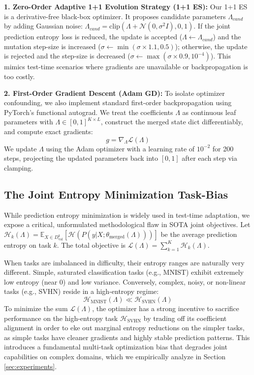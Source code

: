 \textbf{1. Zero-Order Adaptive 1+1 Evolution Strategy (1+1 ES):} Our 1+1 ES is a derivative-free black-box optimizer. It proposes candidate parameters $\Lambda_{cand}$ by adding Gaussian noise: $\Lambda_{cand} = \text{clip}(\Lambda + \mathcal{N}(0, \sigma^2 I), 0, 1)$. If the joint prediction entropy loss is reduced, the update is accepted ($\Lambda \leftarrow \Lambda_{cand}$) and the mutation step-size is increased ($\sigma \leftarrow \min(\sigma \times 1.1, 0.5)$); otherwise, the update is rejected and the step-size is decreased ($\sigma \leftarrow \max(\sigma \times 0.9, 10^{-4})$). This mimics test-time scenarios where gradients are unavailable or backpropagation is too costly.

\textbf{2. First-Order Gradient Descent (Adam GD):} To isolate optimizer confounding, we also implement standard first-order backpropagation using PyTorch's functional autograd. We treat the coefficients $\Lambda$ as continuous leaf parameters with $\Lambda \in [0, 1]^{K \times L}$, construct the merged state dict differentiably, and compute exact gradients:
\begin{equation}
    g = \nabla_{\Lambda} \mathcal{L}(\Lambda)
\end{equation}
We update $\Lambda$ using the Adam optimizer with a learning rate of $10^{-2}$ for 200 steps, projecting the updated parameters back into $[0, 1]$ after each step via clamping.

\subsection{The Joint Entropy Minimization Task-Bias}
While prediction entropy minimization is widely used in test-time adaptation, we expose a critical, unformulated methodological flaw in SOTA joint objectives. Let $\mathcal{H}_k(\Lambda) = \mathbb{E}_{X \in D^k_{\text{val}}} [\mathcal{H}(P(y | X; \theta_{\text{merged}}(\Lambda)))]$ be the average prediction entropy on task $k$. The total objective is $\mathcal{L}(\Lambda) = \sum_{k=1}^K \mathcal{H}_k(\Lambda)$. 

When tasks are imbalanced in difficulty, their entropy ranges are naturally very different. Simple, saturated classification tasks (e.g., MNIST) exhibit extremely low entropy (near 0) and low variance. Conversely, complex, noisy, or non-linear tasks (e.g., SVHN) reside in a high-entropy regime:
\begin{equation}
    \mathcal{H}_{\text{MNIST}}(\Lambda) \ll \mathcal{H}_{\text{SVHN}}(\Lambda)
\end{equation}
To minimize the sum $\mathcal{L}(\Lambda)$, the optimizer has a strong incentive to sacrifice performance on the high-entropy task $\mathcal{H}_{\text{SVHN}}$ by trading off its coefficient alignment in order to eke out marginal entropy reductions on the simpler tasks, as simple tasks have cleaner gradients and highly stable prediction patterns. This introduces a fundamental multi-task optimization bias that degrades joint capabilities on complex domains, which we empirically analyze in Section \ref{sec:experiments}.

